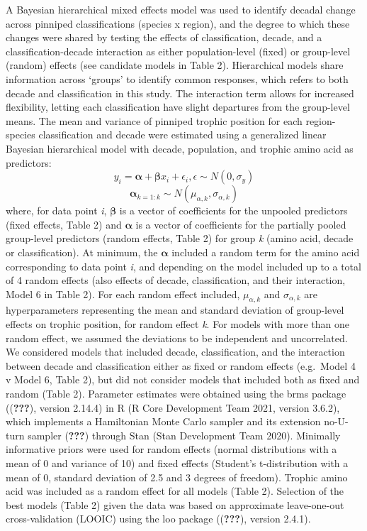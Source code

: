 \documentclass [11pt, proquest] {uwthesis}[2015/03/03]
\begin{document}
A Bayesian hierarchical mixed effects model was used to identify decadal
change across pinniped classifications (species x region), and the
degree to which these changes were shared by testing the effects of
classification, decade, and a classification-decade interaction as
either population-level (fixed) or group-level (random) effects (see
candidate models in Table 2). Hierarchical models share information
across `groups' to identify common responses, which refers to both
decade and classification in this study. The interaction term allows for
increased flexibility, letting each classification have slight
departures from the group-level means. The mean and variance of pinniped
trophic position for each region-species classification and decade were
estimated using a generalized linear Bayesian hierarchical model with
decade, population, and trophic amino acid as predictors:
\begin{equation} 
y_i = \boldsymbol\alpha + \boldsymbol\beta x_i + \epsilon_i, \epsilon \sim N(0,\sigma_y)
  \label{eq:linsex}
\end{equation}
\begin{equation} 
\boldsymbol\alpha_{k=1:k} \sim N(\mu_{\alpha,k},\sigma_{\alpha,k})
  \label{eq:linsex}
\end{equation}
where, for data point \emph{i}, \(\boldsymbol\beta\) is a vector of
coefficients for the unpooled predictors (fixed effects, Table 2) and
\(\boldsymbol\alpha\) is a vector of coefficients for the partially
pooled group-level predictors (random effects, Table 2) for group
\emph{k} (amino acid, decade or classification). At minimum, the
\(\boldsymbol\alpha\) included a random term for the amino acid
corresponding to data point \emph{i}, and depending on the model
included up to a total of 4 random effects (also effects of decade,
classification, and their interaction, Model 6 in Table 2). For each
random effect included, \(\mu_{α,k}\) and \(\sigma_{α,k}\) are
hyperparameters representing the mean and standard deviation of
group-level effects on trophic position, for random effect \emph{k}. For
models with more than one random effect, we assumed the deviations to be
independent and uncorrelated. We considered models that included decade,
classification, and the interaction between decade and classification
either as fixed or random effects (e.g.~Model 4 v Model 6, Table 2), but
did not consider models that included both as fixed and random (Table
2). Parameter estimates were obtained using the brms package
(({\textbf{???}}), version 2.14.4) in R (R Core Development Team 2021,
version 3.6.2), which implements a Hamiltonian Monte Carlo sampler and
its extension no-U-turn sampler ({\textbf{???}}) through Stan (Stan
Development Team 2020). Minimally informative priors were used for
random effects (normal distributions with a mean of 0 and variance of
10) and fixed effects (Student's t-distribution with a mean of 0,
standard deviation of 2.5 and 3 degrees of freedom). Trophic amino acid
was included as a random effect for all models (Table 2). Selection of
the best models (Table 2) given the data was based on approximate
leave-one-out cross-validation (LOOIC) using the loo package
(({\textbf{???}}), version 2.4.1).
\end{document}
